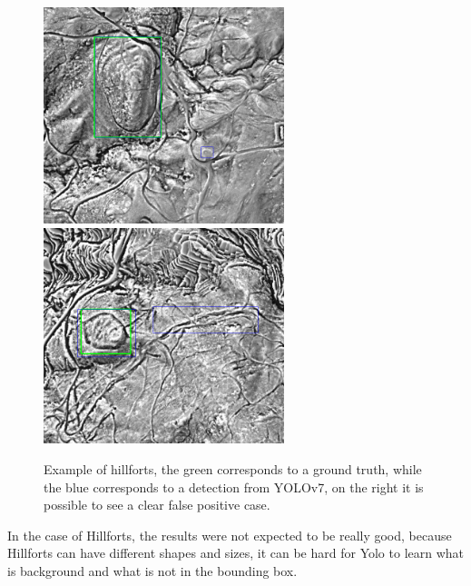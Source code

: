 \begin{figure}[H]
    \centering
    {{\includegraphics[width=7cm]{images/examples_inference/yolov7/castros/1.png} }}
    \qquad
  {{\includegraphics[width=7cm]{images/examples_inference/yolov7/castros/2.png} }}
    \caption{Example of hillforts, the green corresponds to a ground truth, while the blue corresponds to a detection from YOLOv7, on the right it is possible to see a clear false positive case.}
    \label{fig:example}
\end{figure}

In the case of Hillforts, the results were not expected to be really good, because Hillforts can have different shapes and sizes, it can be hard for Yolo to learn what is background and what is not in the bounding box.